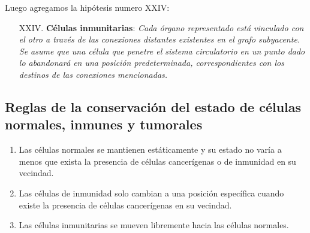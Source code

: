 Luego agregamos la hip\'otesis numero XXIV:

\begin{itemize}
    \item [XXIV.] \textbf{C\'elulas inmunitarias}: \emph{Cada \'organo representado est\'a vinculado con el otro a trav\'es de las conexiones distantes existentes en el grafo subyacente. Se asume que una c\'elula que penetre el sistema circulatorio en un punto dado lo abandonar\'a en una posici\'on predeterminada, correspondientes con los destinos de las conexiones mencionadas.} \label{XXIV}
    \end{itemize}

\subsection{Reglas de la conservaci\'on del estado de c\'elulas normales, inmunes y tumorales}

\begin{enumerate}
	\item Las c\'elulas normales se mantienen est\'aticamente y su estado no var\'ia a menos que exista la presencia de c\'elulas cancer\'igenas o de inmunidad en su vecindad.
	\item Las c\'elulas de inmunidad solo cambian a una posici\'on espec\'ifica cuando existe la presencia de c\'elulas cancer\'igenas en su vecindad.
	\item Las c\'elulas inmunitarias se mueven libremente hacia las c\'elulas normales.
\end{enumerate}

